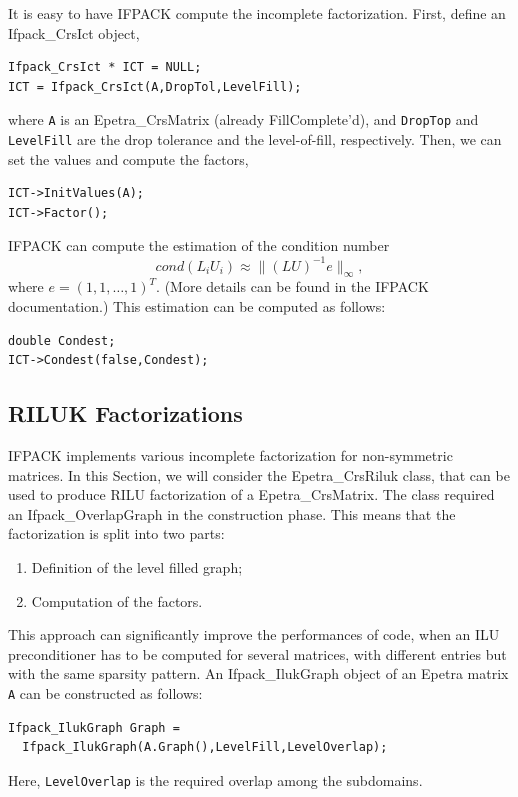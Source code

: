 It is easy to have IFPACK compute the incomplete factorization. First, define
an Ifpack\_CrsIct object,
\begin{verbatim}
Ifpack_CrsIct * ICT = NULL;
ICT = Ifpack_CrsIct(A,DropTol,LevelFill);
\end{verbatim}
where \verb!A! is an Epetra\_CrsMatrix (already FillComplete'd), and
\verb!DropTop! and \verb!LevelFill! are the drop tolerance and the
level-of-fill, respectively. Then, we can set the values and compute the
factors,
\begin{verbatim}
ICT->InitValues(A);
ICT->Factor();
\end{verbatim}

IFPACK can compute the estimation of the condition number
\[
cond(L_i U_i) \approx \|(LU)^{-1} e \|_\infty ,
\]
where $e = (1,1,\dots,1)^T$. (More details can be found in the IFPACK
documentation.) This estimation can be computed as follows:
\begin{verbatim}
double Condest;
ICT->Condest(false,Condest);
\end{verbatim}

\subsection{RILUK  Factorizations}
\label{sec:ifpack_rilu}

IFPACK implements various incomplete factorization for non-symmetric
matrices. In this Section, we will consider the Epetra\_CrsRiluk class,
that can be used to produce RILU factorization of a Epetra\_CrsMatrix.
The class required an Ifpack\_OverlapGraph in the construction phase.
This means that the factorization is split into two parts:
\begin{enumerate}
\item Definition of the level filled graph;
\item Computation of the factors.
\end{enumerate}
This approach can significantly improve the performances of code, when
an ILU preconditioner has to be computed for several matrices, with
different entries but with the same sparsity pattern. An
Ifpack\_IlukGraph object of an Epetra matrix \verb!A! can be constructed
as follows:
\begin{verbatim}
Ifpack_IlukGraph Graph = 
  Ifpack_IlukGraph(A.Graph(),LevelFill,LevelOverlap);
\end{verbatim}
Here, \verb!LevelOverlap! is the required overlap among the subdomains.

